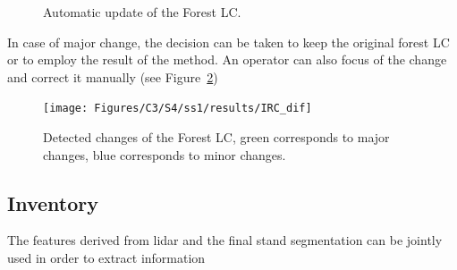\begin{figure}[htbp]
\begin{center}
\begingroup
\captionsetup[subfigure]{width=0.5\textwidth}
\hfill
{}
\endgroup
\caption{Automatic update of the Forest LC.}
\label{fig:new_BD}
\end{center}
\end{figure}

In case of major change, the decision can be taken to keep the original forest LC or to employ the result of the method. An operator can also focus of the change and correct it manually (see Figure~\ref{fig:IRC_change})

\begin{figure}[htbp]
\begin{center}
\texttt{[image: Figures/C3/S4/ss1/results/IRC\_dif]}
\caption{Detected changes of the Forest LC, green corresponds to major changes, blue corresponds to minor changes.}
\label{fig:IRC_change}
\end{center}
\end{figure}

\subsection{Inventory}
The features derived from lidar and the final stand segmentation can be jointly used in order to extract information 

